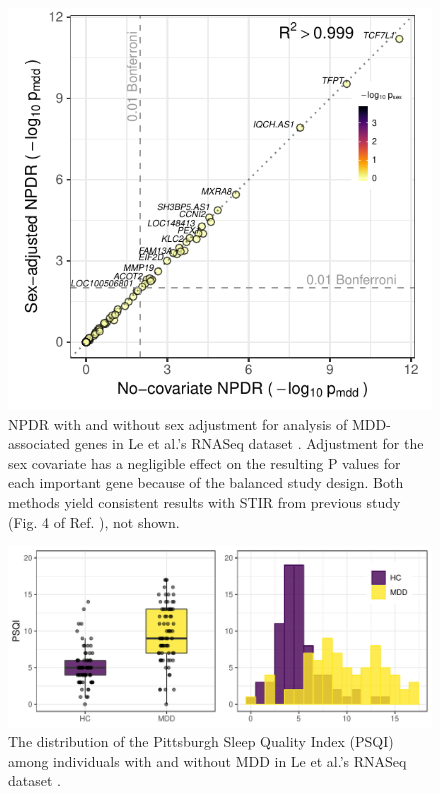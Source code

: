 \documentclass{article}
\begin{document}
\begin{figure}[h]%
\centerline{\includegraphics[]{../figs/jerzy_npdrs_mdd.pdf}}
\caption{NPDR with and without sex adjustment for analysis of MDD-associated genes in Le et al.'s RNASeq dataset \cite{le18}. Adjustment for the sex covariate has a negligible effect on the resulting P values for each important gene because of the balanced study design. Both methods yield consistent results with STIR from previous study (Fig. 4 of Ref. \cite{stir}), not shown.}
\label{fig:jerzy_npdrs_mdd}
\end{figure}

\begin{figure}[h]%
\centerline{\includegraphics[]{../figs/psqi_plots.pdf}}
\caption{The distribution of the Pittsburgh Sleep Quality Index (PSQI) among individuals with and without MDD in Le et al.'s RNASeq dataset \cite{le18}.}
\label{fig:psqi_plots}
\end{figure}



\end{document}
